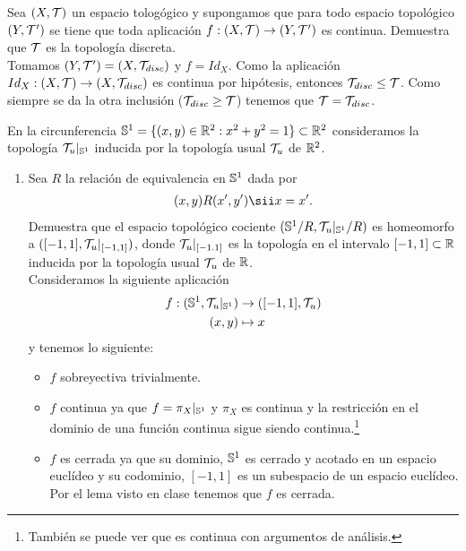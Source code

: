 \documentclass[12pt]{article}
\begin{document}
    \begin{ejercicio}[3 puntos]
        Sea $(X, \mathcal{T})$ un espacio tologógico y supongamos que para todo espacio topológico $(Y, \mathcal{T}')$ se tiene que toda aplicación $f:(X, \mathcal{T})\to (Y, \mathcal{T}')$ es continua. Demuestra que $\mathcal{T}$ es la topología discreta.\\

        Tomamos $(Y, \mathcal{T}')=(X, \mathcal{T}_{disc})$ y $f=Id_X$. Como la aplicación $Id_X : (X, \mathcal{T})\to (X, \mathcal{T}_{disc})$ es continua por hipótesis, entonces $\mathcal{T}_{disc}\leq \mathcal{T}$. Como siempre se da la otra inclusión ($\mathcal{T}_{disc}\geq \mathcal{T}$) tenemos que $\mathcal{T}=\mathcal{T}_{disc}$.
    \end{ejercicio}
    
    \begin{ejercicio}[4 puntos]
        En la circunferencia $\mathbb{S}^1=\{(x,y)\in \mathbb{R}^2 : x^2 + y^2 = 1\}\subset \mathbb{R}^2$ consideramos la topología $\mathcal{T}_u|_{\mathbb{S}^1}$ inducida por la topología usual $\mathcal{T}_u$ de $\mathbb{R}^2$.
        \begin{enumerate}
            \item Sea $R$ la relación de equivalencia en $\mathbb{S}^1$ dada por 
            \begin{align*}
                (x,y)R(x',y') \sii x=x'.
            \end{align*}
            Demuestra que el espacio topológico cociente $(\mathbb{S}^1/R, \mathcal{T}_u|_{\mathbb{S}^1}/R)$ es homeomorfo a $([-1,1], \mathcal{T}_u|_{[-1,1]})$, donde $\mathcal{T}_u|_{[-1.1]}$ es la topología en el intervalo $[-1,1]\subset \mathbb{R}$ inducida por la topología usual $\mathcal{T}_u$ de $\mathbb{R}$.\\

            Consideramos la siguiente aplicación
            \begin{align*}
                f:(\mathbb{S}^1, \mathcal{T}_u|_{\mathbb{S}^1}) &\to ([-1,1], \mathcal{T}_u)\\
                (x,y) &\mapsto x
            \end{align*}
            y tenemos lo siguiente:
            \begin{itemize}
                \item $f$ sobreyectiva trivialmente.
                \item $f$ continua ya que $f=\pi_X|_{\mathbb{S}^1}$ y $\pi_X$ es continua y la restricción en el dominio de una función continua sigue siendo continua.\footnote{También se puede ver que es continua con argumentos de análisis.}
                \item $f$ es cerrada ya que su dominio, $\mathbb{S}^1$ es cerrado y acotado en un espacio euclídeo y su codominio, $[-1,1]$ es un subespacio de un espacio euclídeo. Por el lema visto en clase tenemos que $f$ es cerrada.
            \end{itemize}


\end{enumerate}
\end{ejercicio}
\end{document}
